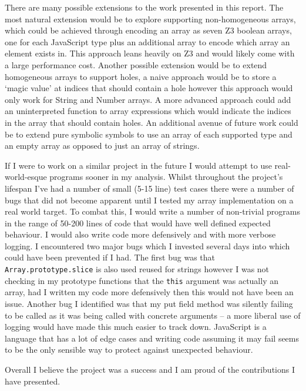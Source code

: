 \documentclass[]{final_report}
\begin{document}
There are many possible extensions to the work presented in this report. The most natural extension would be to explore supporting non-homogeneous arrays, which could be achieved through encoding an array as seven Z3 boolean arrays, one for each JavaScript type plus an additional array to encode which array an element exists in. This approach leans heavily on Z3 and would likely come with a large performance cost. Another possible extension would be to extend homogeneous arrays to support holes, a naive approach would be to store a `magic value' at indices that should contain a hole however this approach would only work for String and Number arrays. A more advanced approach could add an uninterpreted function to array expressions which would indicate the indices in the array that should contain holes. An additional avenue of future work could be to extend pure symbolic symbols to use an array of each supported type and an empty array as opposed to just an array of strings.

If I were to work on a similar project in the future I would attempt to use real-world-esque programs sooner in my analysis. Whilst throughout the project's lifespan I've had a number of small (5-15 line) test cases there were a number of bugs that did not become apparent until I tested my array implementation on a real world target. To combat this, I would write a number of non-trivial programs in the range of 50-200 lines of code that would have well defined expected behaviour. I would also write code more defensively and with more verbose logging. I encountered two major bugs which I invested several days into which could have been prevented if I had. The first bug was that \lstinline|Array.prototype.slice| is also used reused for strings however I was not checking in my prototype functions that the \lstinline|this| argument was actually an array, had I written my code more defensively then this would not have been an issue. Another bug I identified was that my put field method was silently failing to be called as it was being called with concrete arguments -- a more liberal use of logging would have made this much easier to track down. JavaScript is a language that has a lot of edge cases and writing code assuming it may fail seems to be the only sensible way to protect against unexpected behaviour.

Overall I believe the project was a success and I am proud of the contributions I have presented.

\newpage


\label{endpage}
\end{document}
